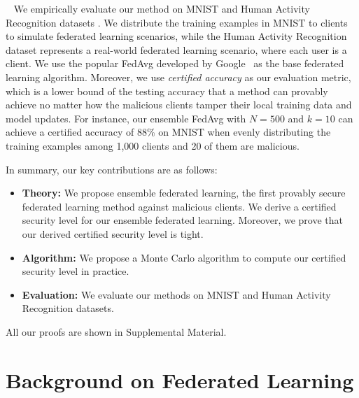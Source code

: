 \documentclass[letterpaper]{article} %
\newcommand{\myparatight}[1]{\smallskip\noindent{\bf {#1}:}~}
\begin{document}
\myparatight{Evaluation} We empirically evaluate our method on MNIST \cite{lecun2010mnist} and Human Activity Recognition datasets \cite{anguita2013public}. We distribute the training examples in MNIST to clients to simulate  federated learning scenarios, while the Human Activity Recognition dataset represents a real-world federated learning scenario, where each user is a client. We use the popular FedAvg developed by Google~\cite{mcmahan2016communication} as the base federated learning algorithm. Moreover, we use \emph{certified accuracy} as our evaluation metric, which is a lower bound of the testing accuracy that a method can provably achieve no matter how the malicious clients tamper their local training data and model updates. For instance, our ensemble FedAvg with $N=500$ and $k=10$ can achieve a certified accuracy of 88\% on MNIST when evenly distributing the training examples among 1,000 clients and 20 of them are malicious.

In summary, our key contributions are as follows:
\begin{itemize}
\item {\bf Theory:} We propose ensemble federated learning, the first provably secure federated learning method against malicious clients. We derive a certified security level for our ensemble federated learning. Moreover, we prove that our derived certified security level is tight.
\item {\bf Algorithm:} We propose a Monte Carlo algorithm to compute our certified security level in practice.
\item {\bf Evaluation:} We evaluate our methods on MNIST and Human Activity Recognition datasets.
\end{itemize}

All our proofs are shown in Supplemental Material.



\section{Background on Federated Learning}
\end{document}
